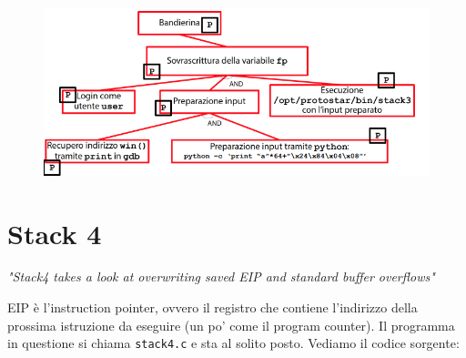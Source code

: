 \begin{figure}[hbpt!]
    \centering
    \includegraphics[width= 0.6 \textwidth]{./Images/cap7/7.6.png}
\end{figure}
\FloatBarrier

\section{Stack 4}
\begin{center}
    \textit{"Stack4 takes a look at overwriting saved
EIP and standard buffer overflows"}
\end{center}
EIP è l'instruction pointer, ovvero il registro che contiene l'indirizzo della prossima istruzione da eseguire (un po' come il program counter). Il programma in questione si chiama \texttt{stack4.c} e sta al solito posto. Vediamo il codice sorgente:

